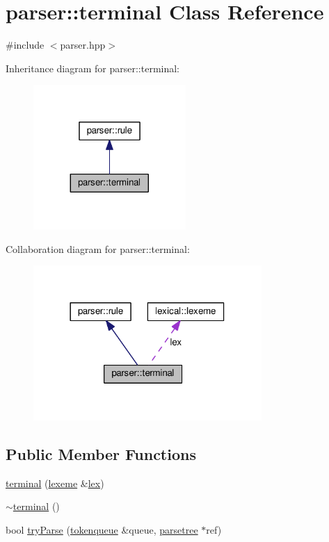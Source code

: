 \hypertarget{classparser_1_1terminal}{}\section{parser\+:\+:terminal Class Reference}
\label{classparser_1_1terminal}


{\ttfamily \#include $<$parser.\+hpp$>$}



Inheritance diagram for parser\+:\+:terminal\+:\nopagebreak
\begin{figure}[H]
\begin{center}
\leavevmode
\includegraphics[width=164pt]{classparser_1_1terminal__inherit__graph}
\end{center}
\end{figure}


Collaboration diagram for parser\+:\+:terminal\+:\nopagebreak
\begin{figure}[H]
\begin{center}
\leavevmode
\includegraphics[width=246pt]{classparser_1_1terminal__coll__graph}
\end{center}
\end{figure}
\subsection*{Public Member Functions}
\begin{DoxyCompactItemize}
\item 
\hyperlink{classparser_1_1terminal_a0029f9a855c1d9dd6939c8fdd5107d72}{terminal} (\hyperlink{classlexical_1_1lexeme}{lexeme} \&\hyperlink{classparser_1_1terminal_a497d13e62829b69f558be62614846236}{lex})
\item 
\hyperlink{classparser_1_1terminal_a04f78fdc1855ad6a61909d1c9ae0df13}{$\sim$terminal} ()
\item 
bool \hyperlink{classparser_1_1terminal_abf7f4ea72388f2e96140769bc5d2acc8}{try\+Parse} (\hyperlink{classparser_1_1tokenqueue}{tokenqueue} \&queue, \hyperlink{structparser_1_1parsetree}{parsetree} $\ast$ref)
\end{DoxyCompactItemize}
